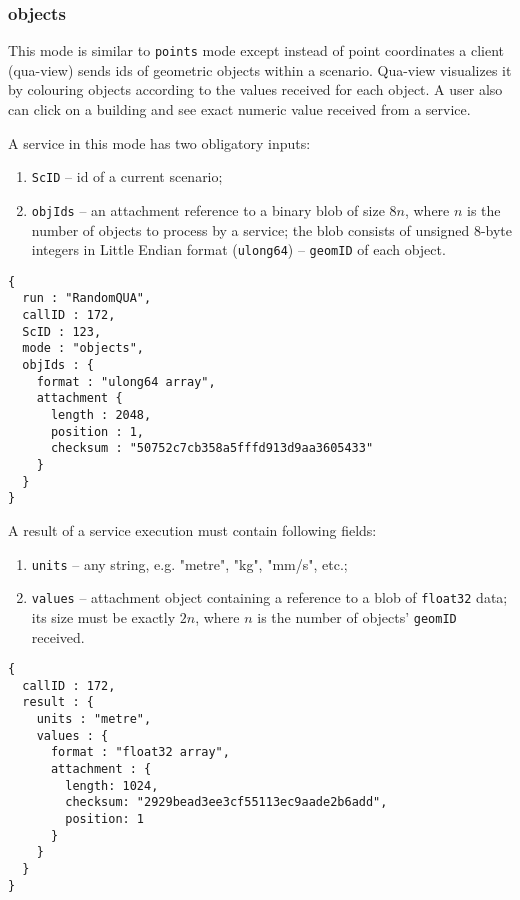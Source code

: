 \subsubsection{objects}

This mode is similar to \texttt{points} mode except instead of point coordinates a client (qua-view) sends ids of geometric objects
within a scenario.
Qua-view visualizes it by colouring objects according to the values received for each object.
A user also can click on a building and see exact numeric value received from a service.

A service in this mode has two obligatory inputs:
\begin{enumerate}
\item \texttt{ScID} -- id of a current scenario;
\item \texttt{objIds} -- an attachment reference to a binary blob of size $8n$, where $n$ is the number of objects to process by a service;
                         the blob consists of unsigned 8-byte integers in Little Endian format (\texttt{ulong64}) -- \texttt{geomID} of each object. 
\end{enumerate}
\begin{lstlisting}[caption={A qua-compliant service run request for mode \texttt{objects}}, label={lst:quacompliantinput:objects}]
{
  run : "RandomQUA",
  callID : 172,
  ScID : 123,
  mode : "objects",
  objIds : {
    format : "ulong64 array",
    attachment {
      length : 2048,
      position : 1,
      checksum : "50752c7cb358a5fffd913d9aa3605433"
    }
  }
}
\end{lstlisting}

A result of a service execution must contain following fields:
\begin{enumerate}
\item \texttt{units} -- any string, e.g. "metre", "kg", "mm/s", etc.;
\item \texttt{values} -- attachment object containing a reference to a blob of \texttt{float32} data;
 its size must be exactly $2 n$, where $n$ is the number of objects' \texttt{geomID} received.
\end{enumerate}
\begin{lstlisting}[caption={A qua-compliant service output for mode \texttt{objects}}, label={lst:quacompliantresult:objects}]
{
  callID : 172,
  result : {
    units : "metre",
    values : {
      format : "float32 array",
      attachment : {
        length: 1024,
        checksum: "2929bead3ee3cf55113ec9aade2b6add",
        position: 1
      }
    }
  }
}
\end{lstlisting}

